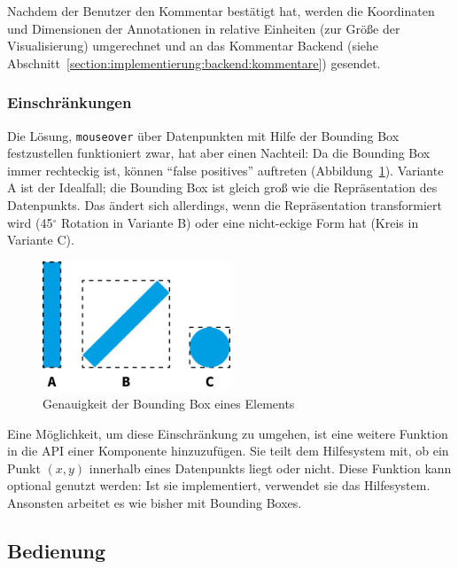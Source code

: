 \documentclass[
	headsepline,
	footsepline,
	fontsize=12pt,
	bibliography=totoc
]{scrbook}
\begin{document}
Nachdem der Benutzer den Kommentar bestätigt hat, werden die Koordinaten und Dimensionen der Annotationen in relative Einheiten (zur Größe der Visualisierung) umgerechnet und an das Kommentar Backend (siehe Abschnitt~\ref{section:implementierung:backend:kommentare}) gesendet.

\subsubsection{Einschränkungen}

Die Lösung, \texttt{mouseover} über Datenpunkten mit Hilfe der Bounding Box festzustellen funktioniert zwar, hat aber einen Nachteil: Da die Bounding Box immer rechteckig ist, können \enquote{false positives} auftreten (Abbildung~\ref{figure:kommentar-bbox}). Variante A ist der Idealfall; die Bounding Box ist gleich groß wie die Repräsentation des Datenpunkts. Das ändert sich allerdings, wenn die Repräsentation transformiert wird (45$^\circ$ Rotation in Variante B) oder eine nicht-eckige Form hat (Kreis in Variante C).

\begin{figure}[htbp]
   \centering
   \includegraphics[width=0.5\textwidth]{images/implementierung-kommentar-bbox.png}
   \caption{Genauigkeit der Bounding Box eines Elements}
   \label{figure:kommentar-bbox}
\end{figure}

Eine Möglichkeit, um diese Einschränkung zu umgehen, ist eine weitere Funktion in die API einer Komponente hinzuzufügen. Sie teilt dem Hilfesystem mit, ob ein Punkt $(x,y)$ innerhalb eines Datenpunkts liegt oder nicht. Diese Funktion kann optional genutzt werden: Ist sie implementiert, verwendet sie das Hilfesystem. Ansonsten arbeitet es wie bisher mit Bounding Boxes.

\subsection{Bedienung}
\label{section:implementierung:frontend:bedienung}
\end{document}
